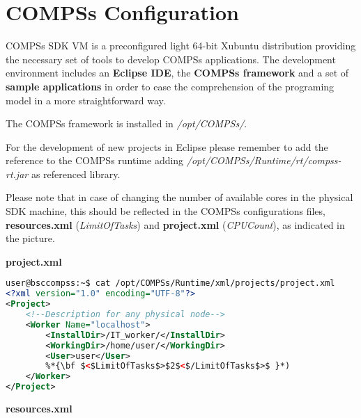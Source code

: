 \section{COMPSs Configuration}
\label{sec:COMPSsConfiguration}

COMPSs SDK VM is a preconfigured light 64-bit Xubuntu distribution providing the necessary set of 
tools to develop COMPSs applications. The development environment includes an {\bf Eclipse IDE}, 
the {\bf COMPSs framework} and a set of {\bf sample applications} in order to ease the comprehension 
of the programing model in a more straightforward way.

The COMPSs framework is installed in {\it /opt/COMPSs/}.

For the development of new projects in Eclipse please remember to add the reference to the COMPSs 
runtime adding {\it /opt/COMPSs/Runtime/rt/compss-rt.jar} as referenced library. 

Please note that in case of changing the number of available cores in the physical SDK machine, this 
should be reflected in the COMPSs configurations files, {\bf resources.xml} ({\it LimitOfTasks}) and 
{\bf project.xml} ({\it CPUCount}), as indicated in the picture.

{\bf project.xml}

\begin{lstlisting}[language=xml]
user@bsccompss:~$ cat /opt/COMPSs/Runtime/xml/projects/project.xml
<?xml version="1.0" encoding="UTF-8"?>
<Project>
    <!--Description for any physical node-->
    <Worker Name="localhost">
        <InstallDir>/IT_worker/</InstallDir>
        <WorkingDir>/home/user/</WorkingDir>
        <User>user</User>
        %*{\bf $<$LimitOfTasks$>$2$<$/LimitOfTasks$>$ }*)
    </Worker>
</Project>
\end{lstlisting}

{\bf resources.xml}

